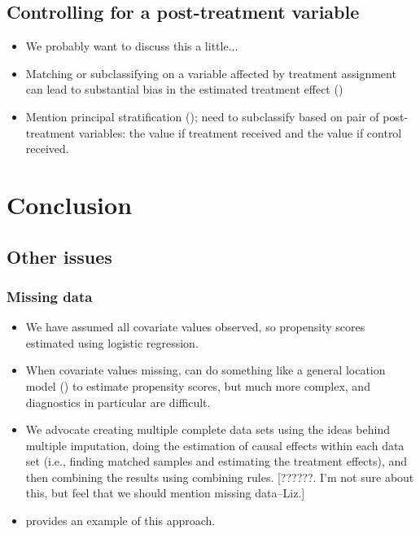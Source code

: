 \documentclass[11pt,titlepage]{article}
\begin{document}
\subsection{Controlling for a post-treatment variable}
\begin{itemize} 
\item We probably want to discuss this a little...
\item Matching or subclassifying on a variable affected by treatment
  assignment can lead to substantial bias in the estimated treatment
  effect (\cite{FraRub02, Greenland03, Imbens04})
\item Mention principal stratification (\cite{FraRub02}); need to
  subclassify based on pair of post-treatment variables: the value if
  treatment received and the value if control received.
\end{itemize}
                                                                                              
\section{Conclusion}
\subsection{Other issues}
\subsubsection{Missing data}
\begin{itemize} 
\item We have assumed all covariate values observed, so propensity
  scores estimated using logistic regression.
\item When covariate values missing, can do something like a general
  location model (\cite{DagRub00}) to estimate propensity scores, but
  much more complex, and diagnostics in particular are difficult.
\item We advocate creating multiple complete data sets using the ideas
  behind multiple imputation, doing the estimation of causal effects
  within each data set (i.e., finding matched samples and estimating
  the treatment effects), and then combining the results using
  combining rules. [??????.  I'm not sure about this, but feel that we
  should mention missing data--Liz.]
\item \cite{Song01} provides an example of this approach.
\end{itemize} 
\end{document}
